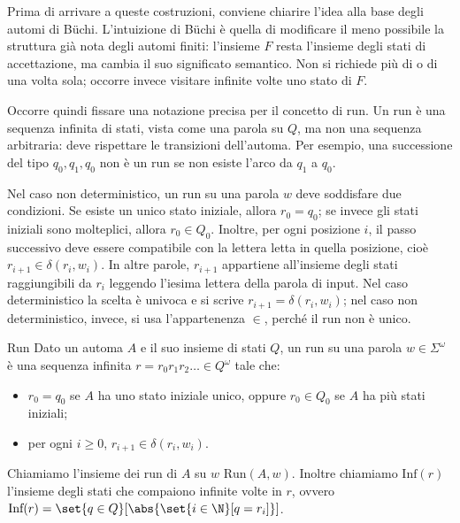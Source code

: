 Prima di arrivare a queste costruzioni, conviene chiarire l'idea alla base degli automi di Büchi. L'intuizione di Büchi è quella di modificare il meno possibile la struttura già nota degli automi finiti: l'insieme \(F\) resta l'insieme degli stati di accettazione, ma cambia il suo significato semantico. Non si richiede più di  o di  una volta sola; occorre invece visitare infinite volte uno stato di \(F\).

Occorre quindi fissare una notazione precisa per il concetto di run. Un run è una sequenza infinita di stati, vista come una parola su \(Q\), ma non una sequenza arbitraria: deve rispettare le transizioni dell'automa. Per esempio, una successione del tipo \(q_0, q_1, q_0\) non è un run se non esiste l'arco da \(q_1\) a \(q_0\).

Nel caso non deterministico, un run su una parola \(w\) deve soddisfare due condizioni. Se esiste un unico stato iniziale, allora \(r_0 = q_0\); se invece gli stati iniziali sono molteplici, allora \(r_0 \in Q_0\). Inoltre, per ogni posizione \(i\), il passo successivo deve essere compatibile con la lettera letta in quella posizione, cioè \(r_{i+1} \in \delta(r_i, w_i)\). In altre parole, \(r_{i+1}\) appartiene all'insieme degli stati raggiungibili da \(r_i\) leggendo l'iesima lettera della parola di input. Nel caso deterministico la scelta è univoca e si scrive \(r_{i+1} = \delta(r_i, w_i)\); nel caso non deterministico, invece, si usa l'appartenenza \(\in\), perché il run non è unico.

\begin{definition}{Run}
  Dato un automa \(A\) e il suo insieme di stati \(Q\), un run su una parola \(w \in \Sigma^\omega\) è una sequenza infinita \(r = r_0 r_1 r_2 \ldots \in Q^\omega\) tale che:
  \begin{itemize}
    \item \(r_0 = q_0\) se \(A\) ha uno stato iniziale unico, oppure \(r_0 \in Q_0\) se \(A\) ha più stati iniziali;
    \item per ogni \(i \geq 0\), \(r_{i+1} \in \delta(r_i, w_i)\).
  \end{itemize}

  Chiamiamo l'insieme dei run di \(A\) su \(w\) \(\text{Run}(A, w)\). Inoltre chiamiamo \(\text{Inf}(r)\) l'insieme degli stati che compaiono infinite volte in \(r\), ovvero \(\text{Inf}(r) = \set{q \in Q}[\abs{\set{i \in \N}[q = r_i]}]\).
\end{definition}

